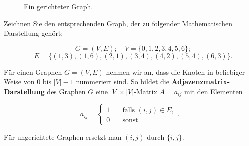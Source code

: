\begin{figure}[htb]
\begin{center}
\caption{Ein gerichteter Graph.}
\label{fig:auf:graph}
\end{center}
\end{figure}


\begin{aufg}
Zeichnen Sie den entsprechenden Graph, der zu folgender Mathematischen Darstellung gehört:

\[ \quad G = (V, E); \quad V = \{0,1,2,3,4,5,6\}; \] 
\[\quad E =  \{ (1,3),(1,6), (2,1), (3,4), (4,2), (5,4), (6,3)\}. \]

\end{aufg}


\begin{mdef}
Für einen Graphen $G=(V,E)$ nehmen wir an, dass die Knoten in beliebiger Weise von 0 bis $|V|-1$ nummeriert sind.
So bildet die \textbf{Adjazenzmatrix-Darstellung} des Graphen $G$ eine $|V| \times |V|$-Matrix $A=a_{ij}$ mit den Elementen

\[ a_{ij} = 
  \begin{cases}
    1   & \quad \text{falls } (i,j) \in E, \\
   0   & \quad \text{sonst}
  \end{cases}.
\]

Für ungerichtete Graphen ersetzt man $(i,j) \text{ durch } \{i,j\}$.
\end{mdef}

